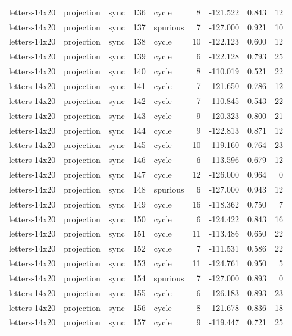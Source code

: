 \begin{tabular}{lllrlrrrr}
letters-14x20 & projection & sync & 136 & cycle & 8 & -121.522 & 0.843 & 12 \\
letters-14x20 & projection & sync & 137 & spurious & 7 & -127.000 & 0.921 & 10 \\
letters-14x20 & projection & sync & 138 & cycle & 10 & -122.123 & 0.600 & 12 \\
letters-14x20 & projection & sync & 139 & cycle & 6 & -122.128 & 0.793 & 25 \\
letters-14x20 & projection & sync & 140 & cycle & 8 & -110.019 & 0.521 & 22 \\
letters-14x20 & projection & sync & 141 & cycle & 7 & -121.650 & 0.786 & 12 \\
letters-14x20 & projection & sync & 142 & cycle & 7 & -110.845 & 0.543 & 22 \\
letters-14x20 & projection & sync & 143 & cycle & 9 & -120.323 & 0.800 & 21 \\
letters-14x20 & projection & sync & 144 & cycle & 9 & -122.813 & 0.871 & 12 \\
letters-14x20 & projection & sync & 145 & cycle & 10 & -119.160 & 0.764 & 23 \\
letters-14x20 & projection & sync & 146 & cycle & 6 & -113.596 & 0.679 & 12 \\
letters-14x20 & projection & sync & 147 & cycle & 12 & -126.000 & 0.964 & 0 \\
letters-14x20 & projection & sync & 148 & spurious & 6 & -127.000 & 0.943 & 12 \\
letters-14x20 & projection & sync & 149 & cycle & 16 & -118.362 & 0.750 & 7 \\
letters-14x20 & projection & sync & 150 & cycle & 6 & -124.422 & 0.843 & 16 \\
letters-14x20 & projection & sync & 151 & cycle & 11 & -113.486 & 0.650 & 22 \\
letters-14x20 & projection & sync & 152 & cycle & 7 & -111.531 & 0.586 & 22 \\
letters-14x20 & projection & sync & 153 & cycle & 11 & -124.761 & 0.950 & 5 \\
letters-14x20 & projection & sync & 154 & spurious & 7 & -127.000 & 0.893 & 0 \\
letters-14x20 & projection & sync & 155 & cycle & 6 & -126.183 & 0.893 & 23 \\
letters-14x20 & projection & sync & 156 & cycle & 8 & -121.678 & 0.836 & 18 \\
letters-14x20 & projection & sync & 157 & cycle & 9 & -119.447 & 0.721 & 25 \\

\end{tabular}
